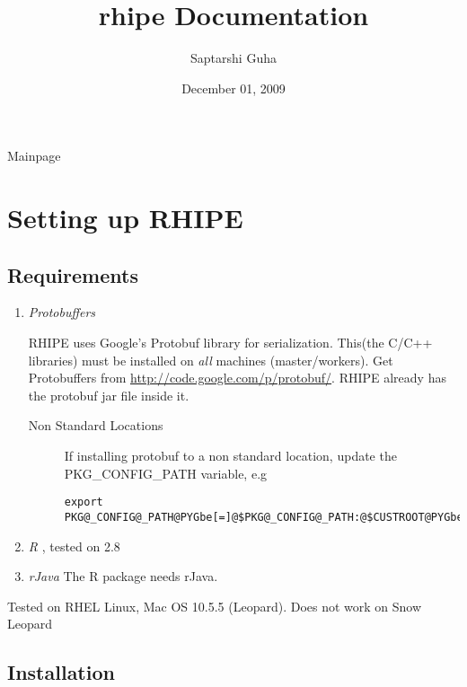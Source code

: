 \documentclass[letterpaper,10pt,english]{manual}
\title{rhipe Documentation}
\date{December 01, 2009}
\author{Saptarshi Guha}
\begin{document}
\maketitle
\tableofcontents



Mainpage

\resetcurrentobjects
\hypertarget{--doc-installation}{}

\chapter{Setting up RHIPE}


\section{Requirements}
\begin{enumerate}
\item {} 
\emph{Protobuffers}

RHIPE uses Google's Protobuf library for serialization. This(the C/C++
libraries) must be installed on \emph{all} machines (master/workers). Get
Protobuffers from \href{http://code.google.com/p/protobuf/}{http://code.google.com/p/protobuf/}. RHIPE already has the
protobuf jar file inside it.
\begin{description}
\item[Non Standard Locations]
If installing protobuf to a non standard location, update the
PKG\_CONFIG\_PATH variable, e.g

\begin{Verbatim}[commandchars=@\[\]]
export PKG@_CONFIG@_PATH@PYGbe[=]@$PKG@_CONFIG@_PATH:@$CUSTROOT@PYGbe[/]lib@PYGbe[/]pkgconfig@PYGbe[/]
\end{Verbatim}

\end{description}

\item {} 
\emph{R} , tested on 2.8

\item {} 
\emph{rJava} The R package needs rJava.

\end{enumerate}

Tested on RHEL Linux, Mac OS 10.5.5 (Leopard).
Does not work on Snow Leopard


\section{Installation}
\end{document}
